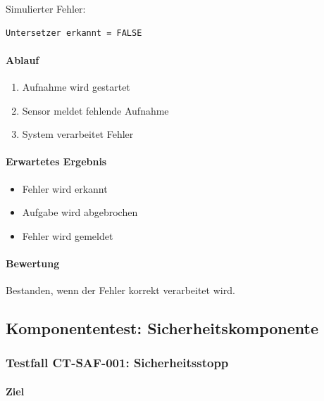 \documentclass[
  a4paper,
  12pt,
  DIV=12,        %
  parskip=half,  %
  headings=small %
]{scrartcl}
\theoremstyle{definition}
\providecommand{\tightlist}{%
  \setlength{\itemsep}{0pt}\setlength{\parskip}{0pt}}
\theoremstyle{definition}
\begin{document}
Simulierter Fehler:

\begin{verbatim}
Untersetzer erkannt = FALSE
\end{verbatim}

\paragraph{Ablauf}\label{ablauf-6}

\begin{enumerate}
\def\labelenumi{\arabic{enumi}.}
\tightlist
\item
  Aufnahme wird gestartet
\item
  Sensor meldet fehlende Aufnahme
\item
  System verarbeitet Fehler
\end{enumerate}

\paragraph{Erwartetes Ergebnis}\label{erwartetes-ergebnis-6}

\begin{itemize}
\tightlist
\item
  Fehler wird erkannt
\item
  Aufgabe wird abgebrochen
\item
  Fehler wird gemeldet
\end{itemize}

\paragraph{Bewertung}\label{bewertung-6}

Bestanden, wenn der Fehler korrekt verarbeitet wird.

\subsection{Komponententest:
Sicherheitskomponente}\label{komponententest-sicherheitskomponente}

\subsubsection{Testfall CT-SAF-001:
Sicherheitsstopp}\label{testfall-ct-saf-001-sicherheitsstopp}

\paragraph{Ziel}\label{ziel-7}
\end{document}

